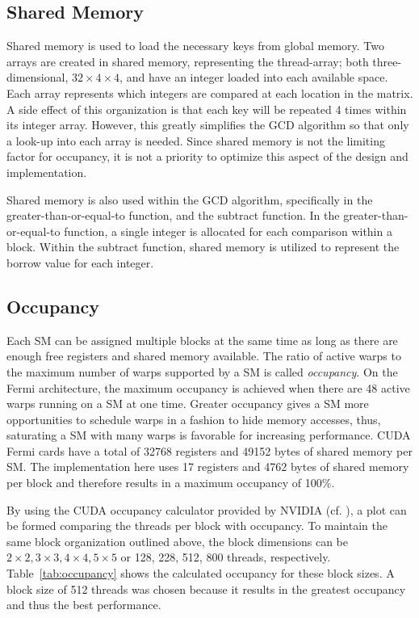 \documentclass[smallextended]{svjour3}       %
\begin{document}
\subsection{Shared Memory}
\label{subsec:shared}
Shared memory is used to load the necessary keys from global memory. Two 
arrays are created in shared memory, representing the thread-array; both 
three-dimensional, $32\times4\times4$, and have an integer loaded into each 
available space. Each array represents which integers are compared at each
location in the matrix. A side effect of this organization is that each key
will be repeated 4 times within its integer array. However, this greatly
simplifies the GCD algorithm so that only a look-up into each array is needed.
Since shared memory is not the limiting factor for occupancy, it is not a
priority to optimize this aspect of the design and implementation. 

Shared memory is also used within the GCD algorithm, specifically in the 
greater-than-or-equal-to function, and the subtract function. In the 
greater-than-or-equal-to function, a single integer is allocated for each 
comparison within a block. Within the subtract function, shared memory is 
utilized to represent the borrow value for each integer. 

\subsection{Occupancy}
\label{sec:occupancy}
Each SM can be assigned multiple blocks at the same time as long as there are 
enough free registers and shared memory available. The ratio of active warps 
to the maximum number of warps supported by a SM is called \emph{occupancy}. 
On the Fermi architecture, the maximum occupancy is achieved when there are 48 
active warps running on a SM at one time. Greater occupancy gives a SM more
opportunities to schedule warps in a fashion to hide memory accesses, thus,
saturating a SM with many warps is favorable for increasing performance. CUDA
Fermi cards have a total of 32768 registers and 49152 bytes of shared memory
per SM. The implementation here uses 17 registers and 4762 bytes of shared
memory per block and therefore results in a maximum occupancy of 100\%.

By using the CUDA occupancy calculator provided by NVIDIA (cf. 
\cite{nvidia2012gpu}), a plot can be formed comparing the threads per block 
with occupancy. To maintain the same block organization outlined above, the 
block dimensions can be $2\times2, 3\times3, 4\times4, 5\times5$ or 128, 228, 
512, 800 threads, respectively. Table~\ref{tab:occupancy} shows the calculated 
occupancy for these block sizes. A block size of 512 threads was chosen 
because it results in the greatest occupancy and thus the best performance. 
\end{document}
